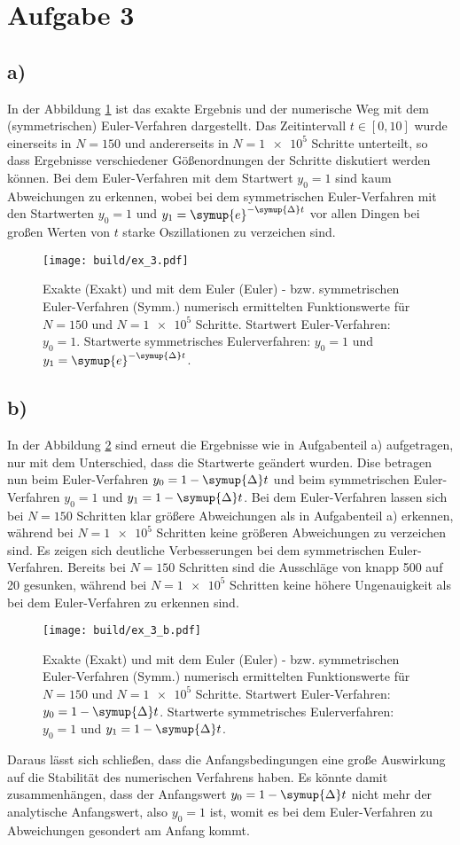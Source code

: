 \section*{Aufgabe 3}
\subsection*{a)}
In der Abbildung \ref{fig:euler} ist das exakte Ergebnis und der numerische Weg mit dem (symmetrischen)
Euler-Verfahren dargestellt.
Das Zeitintervall $t \in [0, 10]$ wurde einerseits in $N = 150$ und andererseits in $N = \num{1e5}$ Schritte 
unterteilt, so dass Ergebnisse verschiedener Gößenordnungen der Schritte diskutiert werden können.
Bei dem Euler-Verfahren mit dem Startwert $y_0 = 1$ sind kaum Abweichungen zu erkennen, wobei 
bei dem symmetrischen Euler-Verfahren mit den Startwerten $y_0 = 1$ und $y_1 = \symup{e}^{-\symup{\Delta}t}$ vor allen Dingen bei großen Werten von $t$ 
starke Oszillationen zu verzeichen sind.
\begin{figure}
    \centering
    \texttt{[image: build/ex\_3.pdf]}
    \caption{Exakte (Exakt) und mit dem Euler (Euler) - bzw. symmetrischen Euler-Verfahren (Symm.) numerisch ermittelten Funktionswerte für
    $N = 150$ und $N = \num{1e5}$ Schritte. 
    Startwert Euler-Verfahren: $y_0 = 1$. Startwerte symmetrisches Eulerverfahren: $y_0 = 1$ und $y_1 = \symup{e}^{-\symup{\Delta}t}$.}
    \label{fig:euler}
\end{figure} 
\subsection*{b)}
In der Abbildung \ref{fig:euler_b} sind erneut die Ergebnisse wie in Aufgabenteil a) aufgetragen, nur mit dem Unterschied, dass 
die Startwerte geändert wurden.
Dise betragen nun beim Euler-Verfahren $y_0 = 1 - \symup{\Delta}t$ und beim symmetrischen Euler-Verfahren 
$y_0 = 1$ und $y_1 = 1 - \symup{\Delta}t$.
Bei dem Euler-Verfahren lassen sich bei $N=150$ Schritten klar größere Abweichungen als in Aufgabenteil a) erkennen, während bei $N = \num{1e5}$
Schritten keine größeren Abweichungen zu verzeichen sind.
Es zeigen sich deutliche Verbesserungen bei dem symmetrischen Euler-Verfahren. 
Bereits bei $N = 150$ Schritten sind die Ausschläge von knapp 500 auf 20 gesunken, 
während bei $N = \num{1e5}$ Schritten keine höhere Ungenauigkeit als bei dem Euler-Verfahren zu erkennen sind.
\begin{figure}
    \centering
    \texttt{[image: build/ex\_3\_b.pdf]}
    \caption{Exakte (Exakt) und mit dem Euler (Euler) - bzw. symmetrischen Euler-Verfahren (Symm.) numerisch ermittelten Funktionswerte für
    $N = 150$ und $N = \num{1e5}$ Schritte.
    Startwert Euler-Verfahren: $y_0 = 1 - \symup{\Delta}t$. 
    Startwerte symmetrisches Eulerverfahren: $y_0 = 1$ und $y_1 = 1 - \symup{\Delta}t$.}
    \label{fig:euler_b}
\end{figure}
Daraus lässt sich schließen, dass die Anfangsbedingungen eine große Auswirkung auf die Stabilität des numerischen Verfahrens haben.
Es könnte damit zusammenhängen, dass der Anfangswert $y_0 = 1 - \symup{\Delta}t$ nicht mehr der analytische Anfangswert, also 
$y_0 = 1$ ist, womit es bei dem Euler-Verfahren zu Abweichungen gesondert am Anfang kommt.